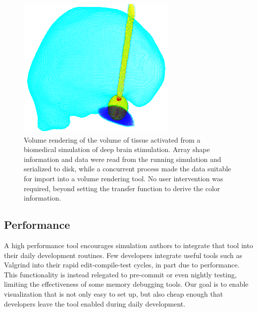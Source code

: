 \begin{figure}
  \includegraphics[width=\linewidth]{images/dbg/brain}

  \caption{Volume rendering of the volume of tissue activated from
  a biomedical simulation of deep brain stimulation.  Array shape
  information and data were read from the running simulation and
  serialized to disk, while a concurrent process made the data suitable
  for import into a volume rendering tool.  No user intervention was
  required, beyond setting the transfer function to derive the color
  information.}


  \label{fig:volren}
\end{figure}

\subsection{Performance}
\label{sec:performance}

A high performance tool encourages simulation authors to integrate that
tool into their daily development routines.  Few developers integrate
useful tools such as Valgrind into their rapid edit-compile-test
cycles, in part due to performance. This functionality is instead
relegated to pre-commit or even nightly testing, limiting the
effectiveness of some memory debugging tools.  Our goal is to enable
visualization that is not only easy to set up, but also cheap enough
that developers leave the tool enabled during daily development.

